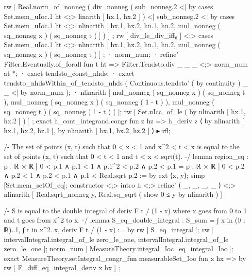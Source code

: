         rw [ Real.norm_of_nonneg ( div_nonneg ( sub_nonneg.2 <| by cases Set.mem_uIoc.1 ht <;> linarith [ hx.1, hx.2 ] ) <| sub_nonneg.2 <| by cases Set.mem_uIoc.1 ht <;> nlinarith [ hx.1, hx.2, hn.1, hn.2, mul_nonneg ( sq_nonneg x ) ( sq_nonneg t ) ] ) ] ; rw [ div_le_div_iff₀ ] <;> cases Set.mem_uIoc.1 ht <;> nlinarith [ hx.1, hx.2, hn.1, hn.2, mul_nonneg ( sq_nonneg x ) ( sq_nonneg t ) ] ;
      · norm_num;
      · refine' Filter.Eventually.of_forall fun t ht => Filter.Tendsto.div _ _ _ <;> norm_num at *;
        · exact tendsto_const_nhds;
        · exact tendsto_nhdsWithin_of_tendsto_nhds ( Continuous.tendsto' ( by continuity ) _ _ <| by norm_num );
        · nlinarith [ mul_nonneg ( sq_nonneg x ) ( sq_nonneg t ), mul_nonneg ( sq_nonneg x ) ( sq_nonneg ( 1 - t ) ), mul_nonneg ( sq_nonneg t ) ( sq_nonneg ( 1 - t ) ) ];
    rw [ Set.uIcc_of_le ( by nlinarith [ hx.1, hx.2 ] ) ] ; exact h_cont_integrand.congr fun z hz => h_deriv z ⟨ by nlinarith [ hx.1, hx.2, hz.1 ], by nlinarith [ hx.1, hx.2, hz.2 ] ⟩ ▸ rfl;

/-
The set of points (x, t) such that 0 < x < 1 and x^2 < t < x is equal to the set of points (x, t) such that 0 < t < 1 and t < x < sqrt(t).
-/
lemma region_eq : {p : ℝ × ℝ | 0 < p.1 ∧ p.1 < 1 ∧ p.1^2 < p.2 ∧ p.2 < p.1} = {p : ℝ × ℝ | 0 < p.2 ∧ p.2 < 1 ∧ p.2 < p.1 ∧ p.1 < Real.sqrt p.2} := by
  ext ⟨x, y⟩; simp [Set.mem_setOf_eq];
  constructor <;> intro h <;> refine' ⟨ _, _, _, _ ⟩ <;> nlinarith [ Real.sqrt_nonneg y, Real.sq_sqrt ( show 0 ≤ y by nlinarith ) ]

/-
S is equal to the double integral of deriv F t / (1 - x) where x goes from 0 to 1 and t goes from x^2 to x.
-/
lemma S_eq_double_integral : S_sum = ∫ x in (0 : ℝ)..1, ∫ t in x^2..x, deriv F t / (1 - x) := by
  rw [ S_eq_integral ];
  rw [ intervalIntegral.integral_of_le zero_le_one, intervalIntegral.integral_of_le zero_le_one ];
  norm_num [ MeasureTheory.integral_Ioc_eq_integral_Ioo ];
  exact MeasureTheory.setIntegral_congr_fun measurableSet_Ioo fun x hx => by rw [ F_diff_eq_integral_deriv x hx ] ;

